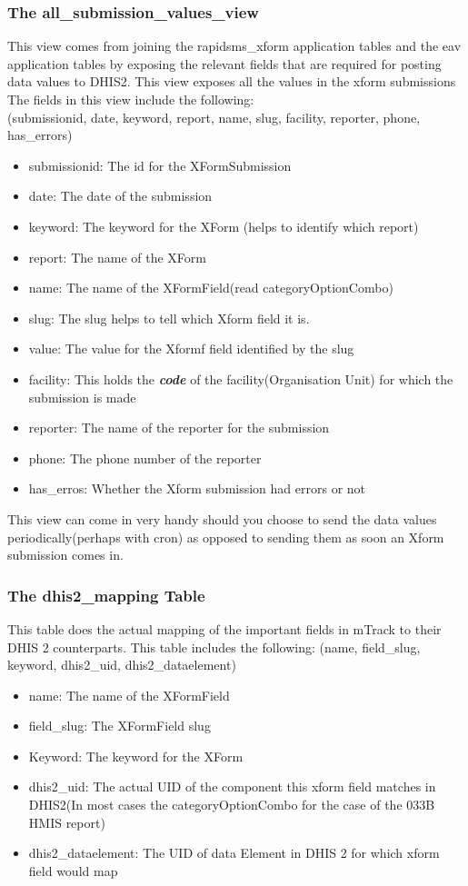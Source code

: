 \documentclass[11pt,a4paper]{article}
\begin{document}
\subsubsection{The all\_submission\_values\_view}
This view comes from joining the rapidsms\_xform application tables and the eav application tables by exposing the relevant fields that are required for posting data values to DHIS2. This view exposes all the values in the xform submissions The fields in this view include the following:\\
(submissionid, date, keyword, report, name, slug, facility, reporter, phone, has\_errors)
\begin{itemize}
\item submissionid: The id for the XFormSubmission
\item date: The date of the submission
\item keyword:	The keyword for the XForm (helps to identify which report)
\item report: The name of the XForm
\item name: The name of the XFormField(read categoryOptionCombo)
\item slug: The slug helps to tell which Xform field it is.
\item value: The value for the Xformf field identified by the slug
\item facility: This holds the \textbf{\emph{code}} of the facility(Organisation Unit) for which the submission is made
\item reporter: The name of the reporter for the submission
\item phone: The phone number of the reporter
\item has\_erros: Whether the Xform submission had errors or not 
\end{itemize}

This view can come in very handy should you choose to send the data values periodically(perhaps with cron) as opposed to sending them as soon an Xform submission comes in. 

\subsubsection{The dhis2\_mapping Table}
This table does the actual mapping of the important fields in mTrack to their DHIS 2 counterparts. This table includes the following:
(name, field\_slug, keyword, dhis2\_uid, dhis2\_dataelement)
\begin{itemize}
\item name: The name of the XFormField
\item field\_slug: The XFormField slug
\item Keyword: The keyword for the XForm
\item dhis2\_uid: The actual UID of the component this xform field matches in DHIS2(In most cases the categoryOptionCombo for the case of the 033B HMIS report)
\item dhis2\_dataelement: The UID of data Element in DHIS 2 for which xform field would map
\end{itemize}
\end{document}
